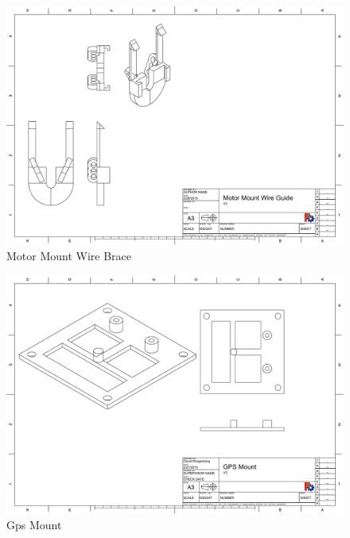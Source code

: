\documentclass[pdftex,11pt]{article}
\begin{document}
\begin{figure}[!h]
	\centering
		\includegraphics[width=1\textwidth]{./graphics/MotorMountWireBracket-eps-converted-to.pdf}
	\caption{Motor Mount Wire Brace}
	\label{fig:motormountwirebrace}
\end{figure}

\begin{figure}[!h]
	\centering
		\includegraphics[width=1\textwidth]{./graphics/gps_mountV2-eps-converted-to.pdf}
	\caption{Gps Mount}
	\label{fig:gpsmount}
\end{figure}
\end{document}

